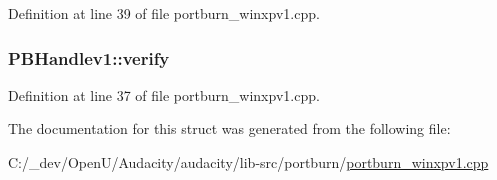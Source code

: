 Definition at line 39 of file portburn\+\_\+winxpv1.\+cpp.

\subsubsection[{\texorpdfstring{verify}{verify}}]{ P\+B\+Handlev1\+::verify}\hypertarget{struct_p_b_handlev1_ab08a0c69301ab6e5fb6277de01413dc3}{}\label{struct_p_b_handlev1_ab08a0c69301ab6e5fb6277de01413dc3}


Definition at line 37 of file portburn\+\_\+winxpv1.\+cpp.



The documentation for this struct was generated from the following file\+:\begin{DoxyCompactItemize}
\item 
C\+:/\+\_\+dev/\+Open\+U/\+Audacity/audacity/lib-\/src/portburn/\hyperlink{portburn__winxpv1_8cpp}{portburn\+\_\+winxpv1.\+cpp}\end{DoxyCompactItemize}
